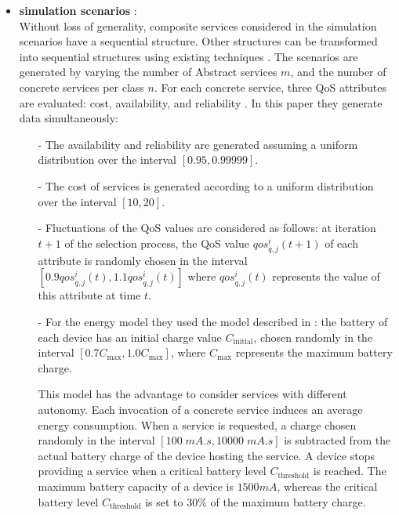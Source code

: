 \documentclass[10pt,journal,compsoc]{IEEEtran}
\begin{document}
\begin{itemize}
\item \textbf{simulation scenarios\cite{DBLP:journals/tase/KhanoucheACKY16} } :\\
 Without loss of generality, composite services considered in the simulation scenarios have a sequential structure. Other structures can be transformed into sequential structures using existing techniques \cite{journals/ws/CardosoSMAK04}. The scenarios are generated by varying the number of Abstract services $m$, and the number of concrete services per class $n$. For each concrete service, three QoS attributes are evaluated: cost, availability, and reliability \cite{DBLP:journals/tase/KhanoucheACKY16}. In this paper they generate data simultaneously:
\begin{itemize}
\item[-] The availability and reliability are generated assuming a uniform distribution over the interval $[0.95, 0.99999]$.
\item[-] The cost of services is generated according to a uniform distribution over the interval $[10, 20]$.
\item[-] Fluctuations of the QoS values are considered as follows: at iteration $t+1$ of the selection process, the QoS value $qos_{q,j}^i (t+1)$ of each attribute is randomly chosen in the interval $[0.9 qos_{q,j}^i(t), 1.1 qos_{q,j}^i(t)]$ where $qos_{q,j}^i(t)$ represents the value of this attribute at time $t$.
\item[-]For the energy model they used the model described in \cite{Flinn:1999:EAM:319344.319155}: the battery of each device has an initial charge value $C_{\text{initial}}$, chosen randomly in the interval $[0.7 C_{\text{max}}, 1.0 C_{\text{max}}]$, where $C_{\text{max}}$ represents the maximum battery charge. 

This model has the advantage to consider services with different autonomy. Each invocation of a concrete service induces an average energy consumption. When a service is requested, a charge chosen randomly in the interval $[100 \; mA.s, 10000 \; mA.s]$ is subtracted from the actual battery charge of the device hosting the service. A device stops providing a service when a critical battery level $C_{\text{threshold}}$ is reached. The maximum battery capacity of a device is $1500 mA$, whereas the critical battery level $C_{\text{threshold}}$ is set to $30\%$ of the maximum battery charge.

\end{itemize}


\end{itemize}
\end{document}
